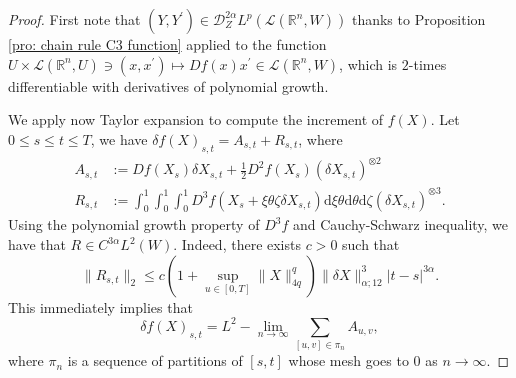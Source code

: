 \documentclass[11pt,a4paper]{article}
\newcommand{\R}{\mathbb{R}}
\newcommand{\rd}{\mathrm{d}}
\theoremstyle{plain}
\begin{document}
\begin{proof}
    First note that $(Y,Y^{\prime}) \in \mathscr{D}_{Z}^{2\alpha}L^p(\mathscr{L}(\R^n,W))$ thanks to Proposition \eqref{pro: chain rule C3 function} applied to the function $U\times \mathscr{L}(\R^n,U) \ni (x,x^\prime) \mapsto Df(x)x^{\prime} \in \mathscr{L}(\R^n,W)$, which is $2$-times differentiable with derivatives of polynomial growth.

    We apply now Taylor expansion to compute the increment of $f(X)$. Let $0\leq s \leq t \leq T$, we have $\delta f(X)_{s,t}
        = A_{s,t} + R_{s,t}$,
        where
    \begin{align*}
        A_{s,t} &:= Df(X_s)\delta X_{s,t} + \frac{1}{2} D^2f(X_s) (\delta X_{s,t})^{\otimes 2}\\
        R_{s,t} &:= \int_{0}^{1}\int_{0}^{1}\int_0^1
            D^3f(X_s + \xi \theta \zeta \delta X_{s,t}) \rd \xi \theta \rd \theta  \rd \zeta (\delta X_{s,t})^{\otimes 3}.
    \end{align*}
    Using the polynomial growth property of $D^3 f$ and Cauchy-Schwarz inequality, we have that $R\in C^{3\alpha}L^2(W)$. Indeed, there exists $c>0$ such that
    \begin{equation*}
        \|R_{s,t}\|_{2}
        \le c (1+\sup_{u\in[0,T]}\|X\|_{{4q}}^q) \|\delta X\|_{\alpha;12}^3 |t-s|^{3\alpha}.
    \end{equation*}
    This immediately implies that
    \begin{equation}
    \label{eq: L2 limit of A}
        \delta f(X)_{s,t} = L^2-\lim_{n\to\infty} \sum_{[u,v]\in \pi_n} A_{u,v},
    \end{equation}
    where $\pi_n$ is a sequence of partitions of $[s,t]$ whose mesh goes to $0$ as $n\to \infty$.


\end{proof}
\end{document}
